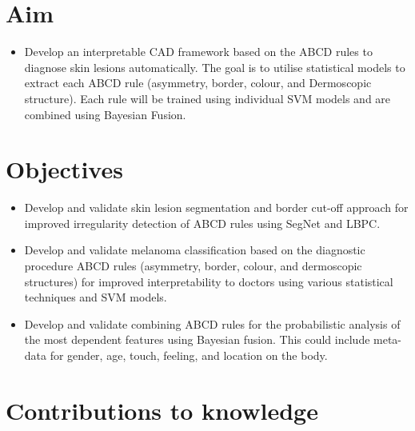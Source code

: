 \section{Aim}

\begin{itemize}
	\item Develop an interpretable CAD framework based on the ABCD rules to diagnose skin lesions automatically. The goal is to utilise statistical models to extract each ABCD rule (asymmetry, border, colour, and Dermoscopic structure). Each rule will be trained using individual SVM models and are combined using Bayesian Fusion.
\end{itemize}

\section{Objectives}
\begin{itemize}

	\item Develop and validate skin lesion segmentation and border cut-off approach for improved irregularity detection of ABCD rules using SegNet and LBPC.
	\item Develop and validate melanoma classification based on the diagnostic procedure ABCD rules (asymmetry, border, colour, and dermoscopic structures) for improved interpretability to doctors using various statistical techniques and SVM models.
	\item Develop and validate combining ABCD rules for the probabilistic analysis of the most dependent features using Bayesian fusion. This could include meta-data for gender, age, touch, feeling, and location on the body.

\end{itemize}

\section{Contributions to knowledge}
 
